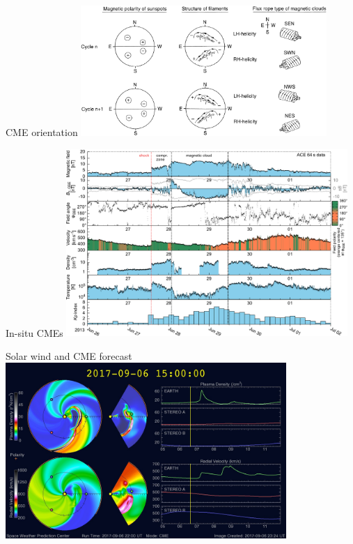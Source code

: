 \begin{frame}[plain,c]{CME orientation}{}
	\includegraphics[width=0.7\textwidth]{../figures_of_others/images/Bothmer1998_fig18.png}
\end{frame}
\begin{frame}[plain,c]{In-situ CMEs}{}
	\includegraphics[width=0.8\textwidth]{../figures_of_mine/gnuplots/ACE_64s_v7_thesis_CME_2013-6-26_6.pdf}
\end{frame}
\begin{frame}[plain,c]{Solar wind and CME forecast}{}
	\includegraphics[width=0.8\textwidth]{../figures_of_others/images/enlil_com1_20170906T150000.jpg}
\end{frame}


